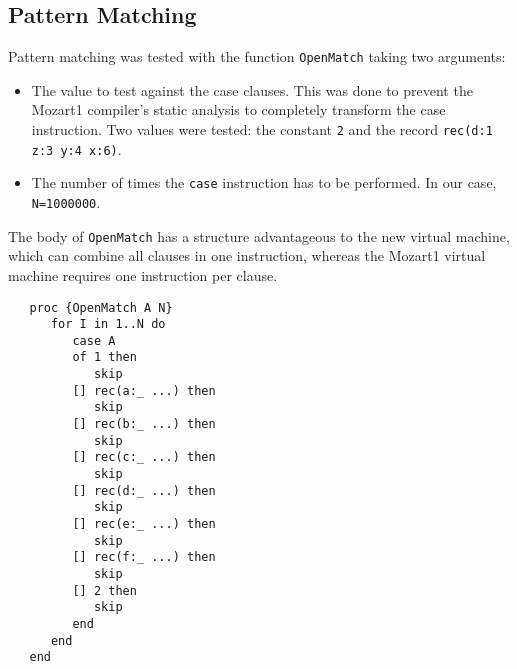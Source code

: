\documentclass[a4paper]{memoir}
\begin{document}
\begin{appendices}
\section{Pattern Matching}

Pattern matching was tested with the function \lstinline!OpenMatch! taking two
arguments:
\begin{itemize}
  \item The value to test against the case clauses. This was done to prevent the
    Mozart1 compiler's static analysis to completely transform the case
    instruction. Two values were tested: the constant \lstinline!2! and the
    record \lstinline!rec(d:1 z:3 y:4 x:6)!. 
  \item The number of times the \lstinline!case! instruction has to be
    performed. In our case, \lstinline!N=1000000!.
\end{itemize} 
The body of \lstinline!OpenMatch! has a structure advantageous to the new
virtual machine, which can combine all clauses in one instruction, whereas the
Mozart1 virtual machine requires one instruction per clause.

\begin{lstlisting}
   proc {OpenMatch A N}
      for I in 1..N do
         case A
         of 1 then
            skip
         [] rec(a:_ ...) then
            skip
         [] rec(b:_ ...) then
            skip
         [] rec(c:_ ...) then
            skip
         [] rec(d:_ ...) then
            skip
         [] rec(e:_ ...) then
            skip
         [] rec(f:_ ...) then
            skip
         [] 2 then
            skip
         end
      end
   end
\end{lstlisting}




\end{appendices}
\end{document}
